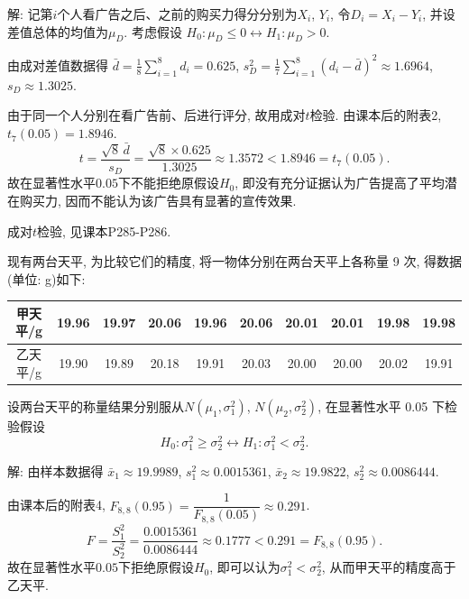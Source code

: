 \documentclass[standard]{ExBook}
\renewenvironment{shaded}{%
  \def\FrameCommand{\fboxsep=\FrameSep \colorbox{shadecolor}}%
  \MakeFramed{\advance\hsize-\width \FrameRestore}%
}{%
  \endMakeFramed
}
\begin{document}
\begin{qitems}
解: 记第$i$个人看广告之后、之前的购买力得分分别为$X_i$, $Y_i$, 令$D_i=X_i-Y_i$, 并设差值总体的均值为$\mu_D$. 考虑假设
$
H_0:\mu_D\leq0
\longleftrightarrow
H_1:\mu_D>0
$.

由成对差值数据得
$
\bar{d}
=\frac{1}{8}\sum_{i=1}^{8}d_i
=0.625
$,
$
s_D^2
=\frac{1}{7}\sum_{i=1}^{8}(d_i-\bar{d})^2
\approx1.6964
$,
$
s_D\approx1.3025
$.

由于同一个人分别在看广告前、后进行评分, 故用成对$t$检验. 由课本后的附表2, $t_7(0.05)=1.8946$.
$$
t
=
\frac{\sqrt{8}\,\bar{d}}{s_D}
=
\frac{\sqrt{8}\times0.625}{1.3025}
\approx1.3572
<
1.8946
=
t_7(0.05).
$$
故在显著性水平$0.05$下不能拒绝原假设$H_0$, 即没有充分证据认为广告提高了平均潜在购买力, 因而不能认为该广告具有显著的宣传效果.

\textcolor{themeColor}{\selectfont {} 成对$t$检验, 见课本P285-P286.}

\vspace{2.5cm-5em}

    \begin{bbox}
    \begin{shaded}
        \qitem
现有两台天平, 为比较它们的精度, 将一物体分别在两台天平上各称量 9 次, 得数据(单位: g)如下:
\begin{center}
\setlength{\tabcolsep}{9pt}
\begin{tabular}{c|ccccccccc}
\hline
甲天平/g & 19.96 & 19.97 & 20.06 & 19.96 & 20.06 & 20.01 & 20.01 & 19.98 & 19.98 \\
\hline
乙天平/g & 19.90 & 19.89 & 20.18 & 19.91 & 20.03 & 20.00 & 20.00 & 20.02 & 19.91 \\
\hline
\end{tabular}
\end{center}
设两台天平的称量结果分别服从$N(\mu_1,\sigma_1^2)$, $N(\mu_2,\sigma_2^2)$, 在显著性水平 0.05 下检验假设
$$H_0 : \sigma_1^2 \geq \sigma_2^2 \longleftrightarrow H_1 : \sigma_1^2 < \sigma_2^2.$$
    \end{shaded}
    \end{bbox}

\vspace{\dimexpr2.5cm-5em\relax}

解: 由样本数据得
$
\bar{x}_1\approx19.9989
$,
$
s_1^2\approx0.0015361
$,
$
\bar{x}_2\approx19.9822
$,
$
s_2^2\approx0.0086444
$.

由课本后的附表4,
$
F_{8,8}(0.95)
=\dfrac{1}{F_{8,8}(0.05)}
\approx0.291
$.
$$
F
=
\frac{S_1^2}{S_2^2}
=
\frac{0.0015361}{0.0086444}
\approx0.1777
<
0.291
=
F_{8,8}(0.95).
$$
故在显著性水平$0.05$下拒绝原假设$H_0$, 即可以认为$\sigma_1^2<\sigma_2^2$, 从而甲天平的精度高于乙天平.


\end{qitems}
\end{document}

